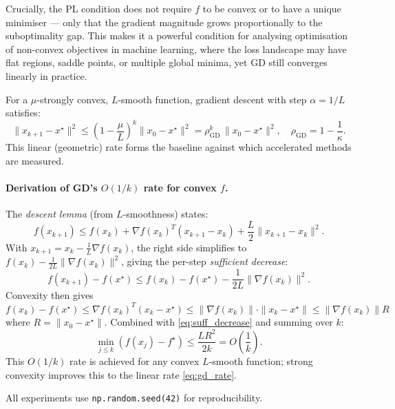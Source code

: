 \documentclass[11pt,a4paper]{article}
\theoremstyle{definition}
\begin{document}
Crucially, the PL condition does not require $f$ to be convex or to have a unique minimiser --- only that the gradient magnitude grows proportionally to the suboptimality gap. This makes it a powerful condition for analysing optimisation of non-convex objectives in machine learning, where the loss landscape may have flat regions, saddle points, or multiple global minima, yet GD still converges linearly in practice.

For a $\mu$-strongly convex, $L$-smooth function, gradient descent with step $\alpha = 1/L$ satisfies:
\begin{equation}
\|x_{k+1} - x^{\star}\|^2 \leq \left(1 - \frac{\mu}{L}\right)^k \|x_0 - x^{\star}\|^2 = \rho_{\text{GD}}^k\,\|x_0 - x^{\star}\|^2, \quad \rho_{\text{GD}} = 1 - \frac{1}{\kappa}.
\label{eq:gd_rate}
\end{equation}
This linear (geometric) rate forms the baseline against which accelerated methods are measured.

\paragraph{Derivation of GD's $O(1/k)$ rate for convex $f$.} The \emph{descent lemma} (from $L$-smoothness) states:
\begin{equation}
f(x_{k+1}) \leq f(x_k) + \nabla f(x_k)^T(x_{k+1}-x_k) + \frac{L}{2}\|x_{k+1}-x_k\|^2.
\label{eq:descent_lemma}
\end{equation}
With $x_{k+1} = x_k - \frac{1}{L}\nabla f(x_k)$, the right side simplifies to $f(x_k) - \frac{1}{2L}\|\nabla f(x_k)\|^2$, giving the per-step \emph{sufficient decrease}:
\begin{equation}
f(x_{k+1}) - f(x^{\star}) \leq f(x_k) - f(x^{\star}) - \frac{1}{2L}\|\nabla f(x_k)\|^2.
\label{eq:suff_decrease}
\end{equation}
Convexity then gives $f(x_k) - f(x^{\star}) \leq \nabla f(x_k)^T(x_k - x^{\star}) \leq \|\nabla f(x_k)\|\cdot\|x_k - x^{\star}\| \leq \|\nabla f(x_k)\| R$ where $R = \|x_0 - x^{\star}\|$. Combined with \eqref{eq:suff_decrease} and summing over $k$:
\begin{equation}
\min_{j \leq k} (f(x_j) - f^{\star}) \leq \frac{LR^2}{2k} = O\!\left(\frac{1}{k}\right).
\label{eq:gd_sublinear}
\end{equation}
This $O(1/k)$ rate is achieved for any convex $L$-smooth function; strong convexity improves this to the linear rate \eqref{eq:gd_rate}.

All experiments use \texttt{np.random.seed(42)} for reproducibility.
\end{document}
